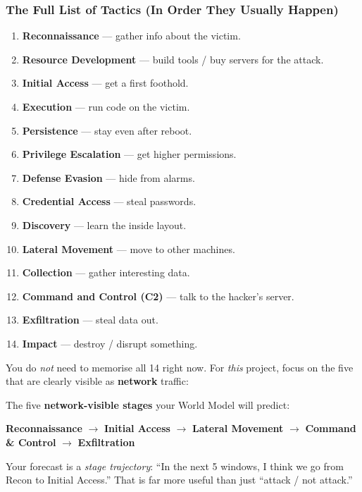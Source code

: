 \documentclass[11pt,a4paper]{article}
\begin{document}
\subsubsection{The Full List of Tactics (In Order They Usually Happen)}

\begin{enumerate}[leftmargin=1.8em,itemsep=2pt]
  \item \textbf{Reconnaissance} --- gather info about the victim.
  \item \textbf{Resource Development} --- build tools / buy servers for the attack.
  \item \textbf{Initial Access} --- get a first foothold.
  \item \textbf{Execution} --- run code on the victim.
  \item \textbf{Persistence} --- stay even after reboot.
  \item \textbf{Privilege Escalation} --- get higher permissions.
  \item \textbf{Defense Evasion} --- hide from alarms.
  \item \textbf{Credential Access} --- steal passwords.
  \item \textbf{Discovery} --- learn the inside layout.
  \item \textbf{Lateral Movement} --- move to other machines.
  \item \textbf{Collection} --- gather interesting data.
  \item \textbf{Command and Control (C2)} --- talk to the hacker's server.
  \item \textbf{Exfiltration} --- steal data out.
  \item \textbf{Impact} --- destroy / disrupt something.
\end{enumerate}

You do \emph{not} need to memorise all 14 right now. For \emph{this} project,
focus on the five that are clearly visible as \textbf{network} traffic:

\begin{keybox}
The five \textbf{network-visible stages} your World Model will predict:

\textbf{Reconnaissance} $\to$ \textbf{Initial Access} $\to$
\textbf{Lateral Movement} $\to$ \textbf{Command \& Control} $\to$
\textbf{Exfiltration}

Your forecast is a \emph{stage trajectory}: ``In the next 5 windows, I think
we go from Recon to Initial Access.'' That is far more useful than just
``attack / not attack.''
\end{keybox}
\end{document}
